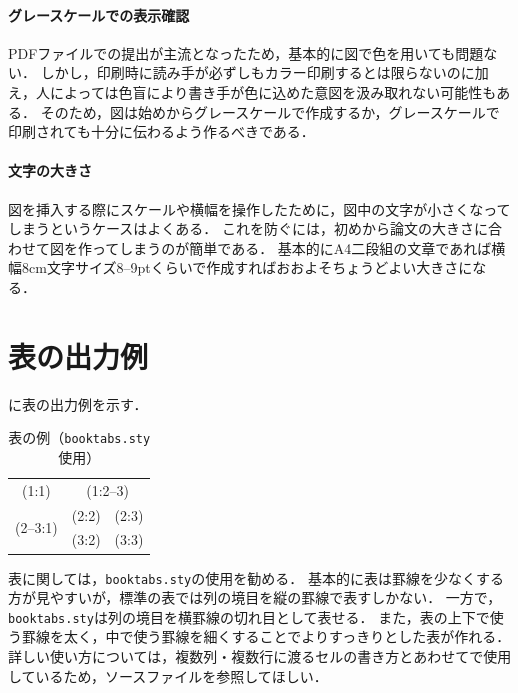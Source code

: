 \paragraph{グレースケールでの表示確認}

PDFファイルでの提出が主流となったため，基本的に図で色を用いても問題ない．
しかし，印刷時に読み手が必ずしもカラー印刷するとは限らないのに加え，人によっては色盲により書き手が色に込めた意図を汲み取れない可能性もある．
そのため，図は始めからグレースケールで作成するか，グレースケールで印刷されても十分に伝わるよう作るべきである．

\paragraph{文字の大きさ}

図を挿入する際にスケールや横幅を操作したために，図中の文字が小さくなってしまうというケースはよくある．
これを防ぐには，初めから論文の大きさに合わせて図を作ってしまうのが簡単である．
基本的にA4二段組の文章であれば横幅8cm文字サイズ8--9ptくらいで作成すればおおよそちょうどよい大きさになる．



\section{表の出力例}

\Tab{\ref{tab:sample}}に表の出力例を示す．

\begin{table}[t]
  \caption{表の例（\texttt{booktabs.sty}使用）}
  \label{tab:sample}
  \centering \small
  \begin{tabular}{ccc}
    \toprule
    (1:1)                     & \multicolumn{2}{c}{(1:2--3)}         \\
    \cmidrule(r){1-1}\cmidrule(l){2-3}
    \multirow{2}{*}{(2--3:1)} & (2:2)                        & (2:3) \\
                              & (3:2)                        & (3:3) \\
    \bottomrule
  \end{tabular}
\end{table}

表に関しては，\texttt{booktabs.sty}の使用を勧める．
基本的に表は罫線を少なくする方が見やすいが，{\LaTeXe}標準の表では列の境目を縦の罫線で表すしかない．
一方で，\texttt{booktabs.sty}は列の境目を横罫線の切れ目として表せる．
また，表の上下で使う罫線を太く，中で使う罫線を細くすることでよりすっきりとした表が作れる．
詳しい使い方については，複数列・複数行に渡るセルの書き方とあわせて\Tab{\ref{tab:sample}}で使用しているため，ソースファイルを参照してほしい．



